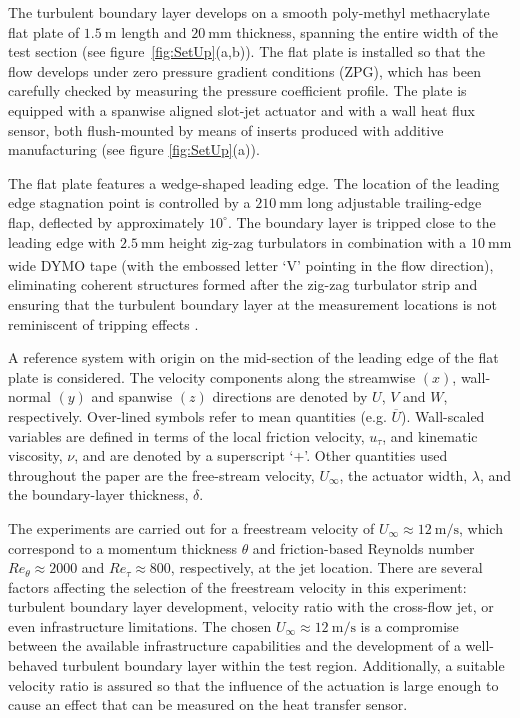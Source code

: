 The turbulent boundary layer develops on a smooth poly-methyl methacrylate flat plate of $1.5~\mathrm{m}$ length and $20~\mathrm{mm}$ thickness, spanning the entire width of the test section (see figure~\ref{fig:SetUp}(a,b)). The flat plate is installed so that the flow develops under zero pressure gradient conditions (ZPG), which has been carefully checked by measuring the pressure coefficient profile. The plate is equipped with a spanwise aligned slot-jet actuator and with a wall heat flux sensor, both flush-mounted by means of inserts produced with additive manufacturing (see figure \ref{fig:SetUp}(a)).

The flat plate features a wedge-shaped leading edge. The location of the leading edge stagnation point is controlled by a $210~\mathrm{mm}$ long adjustable trailing-edge flap, deflected by approximately $10^\circ$. The boundary layer is tripped close to the leading edge with $2.5~\mathrm{mm}$ height zig-zag turbulators in combination with a $10~\mathrm{mm}$ wide DYMO\textsuperscript{\textregistered} tape (with the embossed letter ‘V’ pointing in the flow direction), eliminating coherent structures formed after the zig-zag turbulator strip and ensuring that the turbulent boundary layer at the measurement locations is not reminiscent of tripping effects \citep{sanmiguel2017diagnostic}.

A reference system with origin on the mid-section of the leading edge of the flat plate is considered. The velocity components along the streamwise $(x)$, wall-normal $(y)$ and spanwise $(z)$ directions are denoted by $U$, $V$ and $W$, respectively. Over-lined symbols refer to mean quantities (e.g. $\overline{U}$).
Wall-scaled variables are defined in terms of the local friction velocity, $u_\tau$, and kinematic viscosity, $\nu$, and are denoted by a superscript ‘+’. Other quantities used throughout the paper are the free-stream velocity, $U_\infty$, the actuator width, $\lambda$, and the boundary-layer thickness, $\delta$. 

The experiments are carried out for a freestream velocity of $U_\infty \approx 12~\mathrm{m/s}$, which correspond to a momentum thickness $\theta$ and friction-based Reynolds number $Re_\theta \approx 2000$ and $Re_\tau \approx 800$, respectively, at the jet location. There are several factors affecting the selection of the freestream velocity in this experiment: turbulent boundary layer development, velocity ratio with the cross-flow jet, or even infrastructure limitations. The chosen $U_\infty \approx 12~\mathrm{m/s}$ is a compromise between the available infrastructure capabilities and the development of a well-behaved turbulent boundary layer within the test region. Additionally, a suitable velocity ratio is assured so that the influence of the actuation is large enough to cause an effect that can be measured on the heat transfer sensor.

